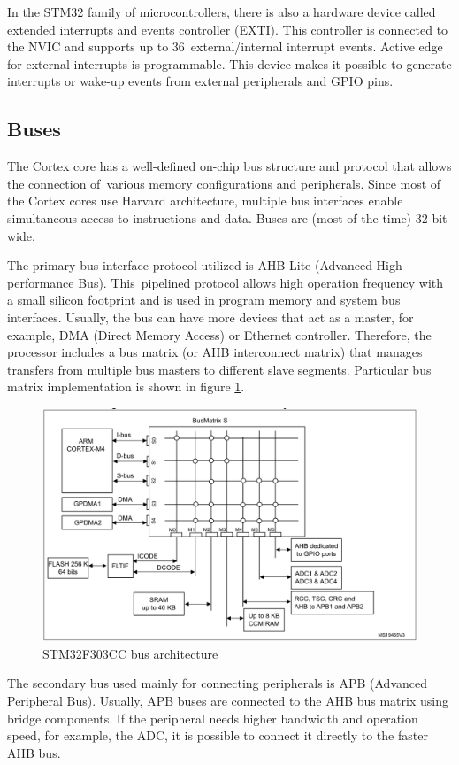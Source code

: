 In the  STM32 family of microcontrollers, there is also a hardware device called extended interrupts and events controller (EXTI). This controller is connected to the NVIC and supports up to 36~external/internal interrupt events. Active edge for external interrupts is programmable. This device makes it possible to generate interrupts or wake-up events from external peripherals and GPIO pins.

	\subsection{Buses}
	\label{sub:buses}
The Cortex core has a well-defined on-chip bus structure and protocol that allows the connection of~various memory configurations and peripherals. Since most of the Cortex cores use Harvard architecture, multiple bus interfaces enable simultaneous access to instructions and data. Buses are (most of the time) 32-bit wide.

The primary bus interface protocol utilized is AHB Lite (Advanced High-performance Bus). This~pipelined protocol allows high operation frequency with a small silicon footprint and is used in program memory and system bus interfaces. Usually, the bus can have more devices that act as a master, for example, DMA (Direct Memory Access) or Ethernet controller. Therefore, the processor includes a bus matrix (or AHB interconnect matrix) that manages transfers from multiple bus masters to different slave segments. Particular bus matrix implementation is shown in figure \ref{fig:f303_busmatrix}.
\begin{figure}[h]
\centering
\includegraphics[width=0.7\linewidth]{support/pic/f303_bus_matrix.png}
\caption{STM32F303CC bus architecture \cite{f303_ref}}
\label{fig:f303_busmatrix}
\end{figure}

The secondary bus used mainly for connecting peripherals is APB (Advanced Peripheral Bus). Usually, APB buses are connected to the AHB bus matrix using bridge components. If the peripheral needs higher bandwidth and operation speed, for example, the ADC, it is possible to connect it directly to the faster AHB bus.

